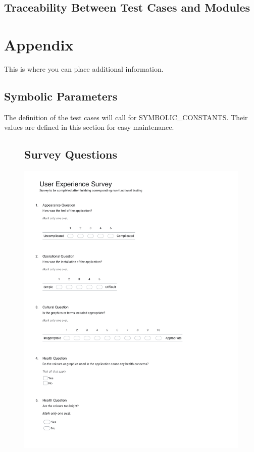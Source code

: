 \documentclass[12pt, titlepage]{article}
\begin{document}
\subsection{Traceability Between Test Cases and Modules}

				




\newpage

\section{Appendix}

This is where you can place additional information.

\subsection{Symbolic Parameters}

The definition of the test cases will call for SYMBOLIC\_CONSTANTS.
Their values are defined in this section for easy maintenance.


\begin{figure}
  \subsection{Survey Questions}
  \centering
  \includegraphics[width=1\textwidth]{User Experience Survey.pdf}
\end{figure}
\end{document}
